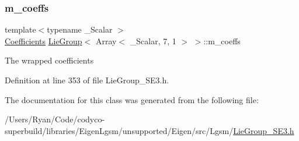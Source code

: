 \subsubsection{\texorpdfstring{m\+\_\+coeffs}{m\_coeffs}}
{\footnotesize\ttfamily template$<$typename \+\_\+\+Scalar $>$ \\
\hyperlink{class_lie_group_3_01_array_3_01___scalar_00_017_00_011_01_4_01_4_aa5d0fac468a8bdbb468bf2218b93ee0e}{Coefficients} \hyperlink{class_lie_group}{Lie\+Group}$<$ Array$<$ \+\_\+\+Scalar, 7, 1 $>$ $>$\+::m\+\_\+coeffs\hspace{0.3cm}{\ttfamily [protected]}}

The wrapped coefficients 

Definition at line 353 of file Lie\+Group\+\_\+\+S\+E3.\+h.



The documentation for this class was generated from the following file\+:\begin{DoxyCompactItemize}
\item 
/\+Users/\+Ryan/\+Code/codyco-\/superbuild/libraries/\+Eigen\+Lgsm/unsupported/\+Eigen/src/\+Lgsm/\hyperlink{_lie_group___s_e3_8h}{Lie\+Group\+\_\+\+S\+E3.\+h}\end{DoxyCompactItemize}
